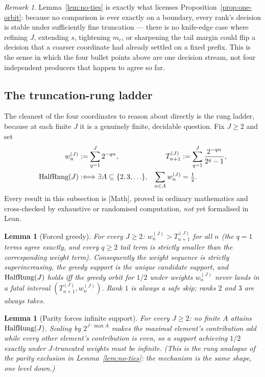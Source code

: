 \documentclass[11pt]{article}
\theoremstyle{plain}
\newtheorem{lem}[thm]{Lemma}
\theoremstyle{definition}
\theoremstyle{remark}
\newtheorem{rem}[thm]{Remark}
\let\origmathrm\mathrm
\renewcommand{\mathrm}[1]{\ifmmode\origmathrm{#1}\else\textrm{#1}\fi}%
\newcommand{\ev}[1]{{\small\textsf{[#1]}}\xspace}
\begin{document}
\begin{rem}
Lemma~\ref{lem:no-ties} is exactly what licenses Proposition~\ref{prop:one-orbit}: because no
comparison is ever exactly on a boundary, every rank's decision is stable under sufficiently fine
truncation — there is no knife-edge case where refining $J$, extending $s$, tightening $m_c$, or
sharpening the tail margin could flip a decision that a coarser coordinate had already settled on a
fixed prefix. This is the sense in which the four bullet points above are one decision stream, not
four independent producers that happen to agree so far.
\end{rem}

\subsection*{The truncation-rung ladder}

The cleanest of the four coordinates to reason about directly is the rung ladder, because at each
finite $J$ it is a genuinely finite, decidable question. Fix $J\ge2$ and set
\[
\begin{aligned}
w_n^{(J)}&:=\sum_{q=1}^{J}2^{-qn}, &
T_{n+1}^{(J)}&:=\sum_{q=1}^{J}\frac{2^{-qn}}{2^q-1},\\
\mathrm{HalfRung}(J)&:\Longleftrightarrow
\exists A\subseteq\{2,3,\ldots\},&
\sum_{n\in A}w_n^{(J)}&=\tfrac12.
\end{aligned}
\]
Every result in this subsection is \ev{Math}, proved in ordinary mathematics and cross-checked by
exhaustive or randomised computation, \emph{not} yet formalised in Lean.

\begin{lem}[Forced greedy]
\label{lem:tr-forced-greedy}
For every $J\ge2$: $w_n^{(J)}>T_{n+1}^{(J)}$ for all $n$ (the $q=1$ terms agree exactly, and every
$q\ge2$ tail term is strictly smaller than the corresponding weight term). Consequently the weight
sequence is strictly superincreasing, the greedy support is the unique candidate support, and
$\mathrm{HalfRung}(J)$ holds iff the greedy orbit for $1/2$ under weights $w_n^{(J)}$ never lands in
a fatal interval $(T_{n+1}^{(J)},w_n^{(J)})$. Rank $1$ is always a safe skip; ranks $2$ and $3$ are
always takes.
\end{lem}

\begin{lem}[Parity forces infinite support]
\label{lem:tr-parity}
For every $J\ge2$: no finite $A$ attains $\mathrm{HalfRung}(J)$. Scaling by $2^{J\cdot\max A}$ makes
the maximal element's contribution odd while every other element's contribution is even, so a
support achieving $1/2$ exactly under $J$-truncated weights must be infinite. (This is the rung
analogue of the parity exclusion in Lemma~\ref{lem:no-ties}: the mechanism is the same shape, one
level down.)
\end{lem}
\end{document}
